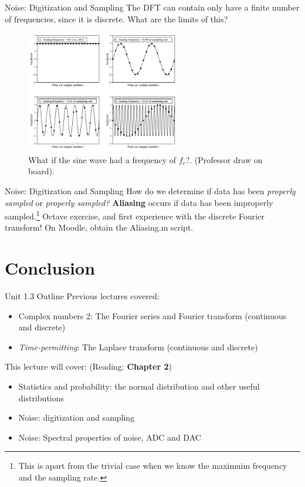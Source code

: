 \documentclass{beamer}
\begin{document}
\begin{frame}{Noise: Digitization and Sampling}
The DFT can contain only have a finite number of frequencies, since it is discrete.  What are the limits of this?
\begin{figure}
\centering
\includegraphics[width=0.6\textwidth]{figures/sampling.png}
\caption{\label{fig:sampling2} What if the sine wave had a frequency of $f_{c}$?. (Professor draw on board).}
\end{figure}
\end{frame}

\begin{frame}{Noise: Digitization and Sampling}
How do we determine if data has been \textit{properly sampled} or \textit{properly sampled?} \textbf{Aliasing} occurs if data has been improperly sampled.\footnote{This is apart from the trivial case when we know the maximuim frequency and the sampling rate.}
Octave exercise, and first experience with the discrete Fourier transform!  On Moodle, obtain the Aliasing.m script.
\end{frame}

\section{Conclusion}

\begin{frame}{Unit 1.3 Outline}
Previous lectures covered:
\begin{itemize}
\item Complex numbers 2: The Fourier series and Fourier transform (continuous and discrete)
\item \textit{Time-permitting}: The Laplace transform (continuous and discrete)
\end{itemize}
This lecture will cover: (Reading: \textbf{Chapter 2})
\begin{itemize}
\item \alert{Statistics and probability: the normal distribution and other useful distributions}
\item \alert{Noise: digitization and sampling}
\item Noise: Spectral properties of noise, ADC and DAC
\end{itemize}
\end{frame}
\end{document}

